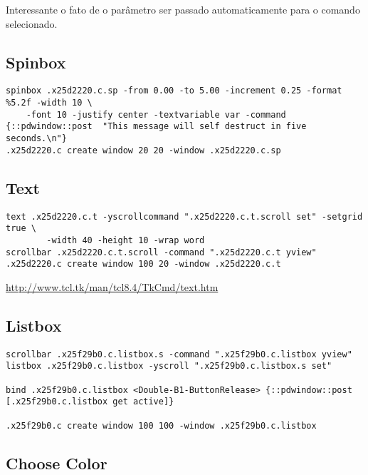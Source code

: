 Interessante o fato de o parâmetro ser passado automaticamente para o comando
selecionado.

\subsection{Spinbox}

\begin{lstlisting}
spinbox .x25d2220.c.sp -from 0.00 -to 5.00 -increment 0.25 -format %5.2f -width 10 \
    -font 10 -justify center -textvariable var -command {::pdwindow::post  "This message will self destruct in five seconds.\n"}
.x25d2220.c create window 20 20 -window .x25d2220.c.sp
\end{lstlisting}

\subsection{Text}

\begin{lstlisting}
text .x25d2220.c.t -yscrollcommand ".x25d2220.c.t.scroll set" -setgrid true \
        -width 40 -height 10 -wrap word
scrollbar .x25d2220.c.t.scroll -command ".x25d2220.c.t yview"
.x25d2220.c create window 100 20 -window .x25d2220.c.t
\end{lstlisting}
\url{http://www.tcl.tk/man/tcl8.4/TkCmd/text.htm}

\subsection{Listbox}

\begin{lstlisting}
scrollbar .x25f29b0.c.listbox.s -command ".x25f29b0.c.listbox yview"
listbox .x25f29b0.c.listbox -yscroll ".x25f29b0.c.listbox.s set"

bind .x25f29b0.c.listbox <Double-B1-ButtonRelease> {::pdwindow::post [.x25f29b0.c.listbox get active]}

.x25f29b0.c create window 100 100 -window .x25f29b0.c.listbox
\end{lstlisting}

\subsection{Choose Color}

